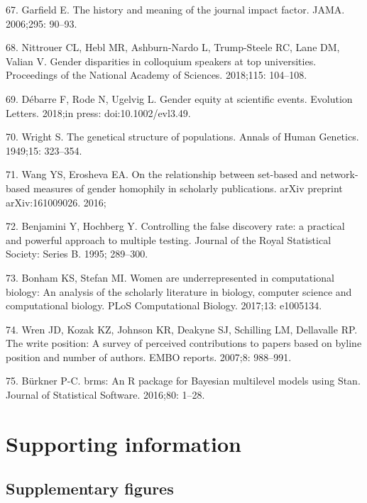 \documentclass[12pt,]{article}
\begin{document}
\hypertarget{ref-Garfield_2006}{}
67. Garfield E. The history and meaning of the journal impact factor.
JAMA. 2006;295: 90--93.

\hypertarget{ref-nittrouer_2018}{}
68. Nittrouer CL, Hebl MR, Ashburn-Nardo L, Trump-Steele RC, Lane DM,
Valian V. Gender disparities in colloquium speakers at top universities.
Proceedings of the National Academy of Sciences. 2018;115: 104--108.

\hypertarget{ref-debarre_2018}{}
69. Débarre F, Rode N, Ugelvig L. Gender equity at scientific events.
Evolution Letters. 2018;in press: doi:10.1002/evl3.49.

\hypertarget{ref-wright_1949}{}
70. Wright S. The genetical structure of populations. Annals of Human
Genetics. 1949;15: 323--354.

\hypertarget{ref-wang_2016}{}
71. Wang YS, Erosheva EA. On the relationship between set-based and
network-based measures of gender homophily in scholarly publications.
arXiv preprint arXiv:161009026. 2016;

\hypertarget{ref-Benjamini_1995}{}
72. Benjamini Y, Hochberg Y. Controlling the false discovery rate: a
practical and powerful approach to multiple testing. Journal of the
Royal Statistical Society: Series B. 1995; 289--300.

\hypertarget{ref-Bonham_2017}{}
73. Bonham KS, Stefan MI. Women are underrepresented in computational
biology: An analysis of the scholarly literature in biology, computer
science and computational biology. PLoS Computational Biology. 2017;13:
e1005134.

\hypertarget{ref-Wren_2007}{}
74. Wren JD, Kozak KZ, Johnson KR, Deakyne SJ, Schilling LM, Dellavalle
RP. The write position: A survey of perceived contributions to papers
based on byline position and number of authors. EMBO reports. 2007;8:
988--991.

\hypertarget{ref-burkner_2016}{}
75. Bürkner P-C. brms: An R package for Bayesian multilevel models using
Stan. Journal of Statistical Software. 2016;80: 1--28.

\newpage

\section{Supporting information}\label{supporting-information}

\subsection{Supplementary figures}\label{supplementary-figures}
\end{document}
